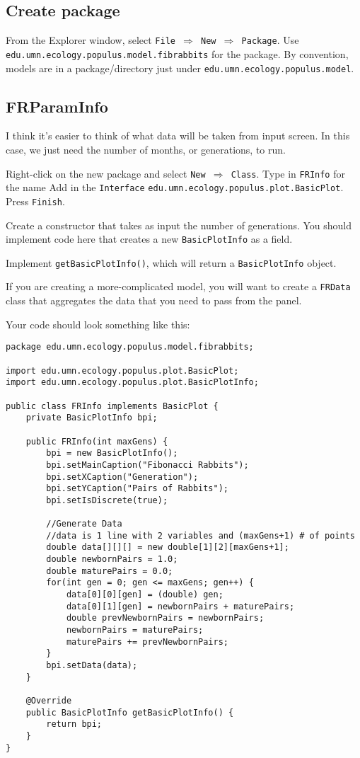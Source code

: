 \documentclass[12pt]{article}
\begin{document}
\subsection{Create package}
From the Explorer window, select \texttt{File $\Rightarrow$ New $\Rightarrow$ Package}.
Use \texttt{edu.umn.ecology.populus.model.fibrabbits} for the package.  By convention, models are in a package/directory just under \texttt{edu.umn.ecology.populus.model}.

\subsection{FRParamInfo}
I think it's easier to think of what data will be taken from input screen.  In this case, we just need the number of months, or generations, to run.

Right-click on the new package and select \texttt{New $\Rightarrow$ Class}.
Type in \texttt{FRInfo} for the name
Add in the \texttt{Interface} \texttt{edu.umn.ecology.populus.plot.BasicPlot}.
Press \texttt{Finish}.

Create a constructor that takes as input the number of generations.  You should implement code here that creates a new \texttt{BasicPlotInfo} as a field.

Implement \texttt{getBasicPlotInfo()}, which will return a \texttt{BasicPlotInfo} object.

If you are creating a more-complicated model, you will want to create a \texttt{FRData} class that aggregates the data that you need to pass from the panel.

Your code should look something like this:

\begin{verbatim}
package edu.umn.ecology.populus.model.fibrabbits;

import edu.umn.ecology.populus.plot.BasicPlot;
import edu.umn.ecology.populus.plot.BasicPlotInfo;

public class FRInfo implements BasicPlot {
    private BasicPlotInfo bpi;

    public FRInfo(int maxGens) {
        bpi = new BasicPlotInfo();
        bpi.setMainCaption("Fibonacci Rabbits");
        bpi.setXCaption("Generation");
        bpi.setYCaption("Pairs of Rabbits");
        bpi.setIsDiscrete(true);
		
        //Generate Data
        //data is 1 line with 2 variables and (maxGens+1) # of points
        double data[][][] = new double[1][2][maxGens+1]; 
        double newbornPairs = 1.0;
        double maturePairs = 0.0;
        for(int gen = 0; gen <= maxGens; gen++) {
            data[0][0][gen] = (double) gen;
            data[0][1][gen] = newbornPairs + maturePairs;
            double prevNewbornPairs = newbornPairs;
            newbornPairs = maturePairs;
            maturePairs += prevNewbornPairs;
        }
        bpi.setData(data);
    }
	
    @Override
    public BasicPlotInfo getBasicPlotInfo() {
        return bpi;
    }
}
\end{verbatim}
\end{document}
